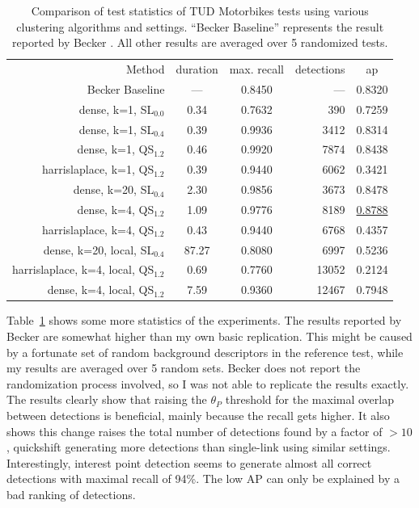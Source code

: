 \begin{table}
    \caption{Comparison of test statistics of TUD Motorbikes tests using various clustering algorithms and settings. ``Becker Baseline'' represents the result reported by Becker \cite{becker2012codebook}. All other results are averaged over 5 randomized tests.}
    \label{tab:tudallstats}
    \begin{tabular}{r|ccr|c}
    Method&duration&max. recall&detections&ap\\
    Becker Baseline&---&0.8450&---&0.8320\\
    dense, k=1, SL$_{0.0}$&0.34&0.7632&390&0.7259\\
    dense, k=1, SL$_{0.4}$&0.39&0.9936&3412&0.8314\\
    dense, k=1, QS$_{1.2}$&0.46&0.9920&7874&0.8438\\
    harrislaplace, k=1, QS$_{1.2}$&0.39&0.9440&6062&0.3421\\
    dense, k=20, SL$_{0.4}$&2.30&0.9856&3673&0.8478\\
    dense, k=4, QS$_{1.2}$&1.09&0.9776&8189&\underline{0.8788}\\
    harrislaplace, k=4, QS$_{1.2}$&0.43&0.9440&6768&0.4357\\
    dense, k=20, local, SL$_{0.4}$&87.27&0.8080&6997&0.5236\\
    harrislaplace, k=4, local, QS$_{1.2}$&0.69&0.7760&13052&0.2124\\
    dense, k=4, local, QS$_{1.2}$&7.59&0.9360&12467&0.7948
    \end{tabular}
\end{table}

Table~\ref{tab:tudallstats} shows some more statistics of the experiments. The results reported by Becker are somewhat higher than my own basic replication. This might be caused by a fortunate set of random background descriptors in the reference test, while my results are averaged over 5 random sets. Becker does not report the randomization process involved, so I was not able to replicate the results exactly. The results clearly show that raising the $\theta_P$ threshold for the maximal overlap between detections is beneficial, mainly because the recall gets higher. It also shows this change raises the total number of detections found by a factor of $>10$, quickshift generating more detections than single-link using similar settings. Interestingly, interest point detection seems to generate almost all correct detections with maximal recall of 94\%. The low AP can only be explained by a bad ranking of detections.

